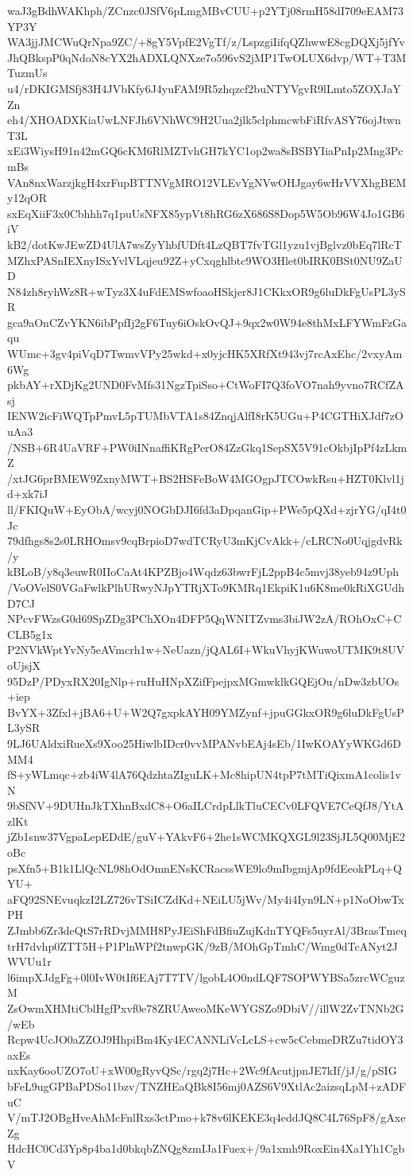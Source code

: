 waJ3gBdhWAKhph/ZCnzc0JSfV6pLmgMBvCUU+p2YTj08rmH58dI709eEAM73YP3Y
WA3jjJMCWuQrNpa9ZC/+8gY5VpfE2VgTf/z/LspzgiIifqQZhwwE8cgDQXj5jfYv
JhQBkspP0qNdoN8cYX2hADXLQNXze7o596vS2jMP1TwOLUX6dvp/WT+T3MTuzmUs
u4/rDKIGMSfj83H4JVbKfy6J4yuFAM9R5zhqzcf2buNTYVgvR9lLmto5ZOXJaYZn
eh4/XHOADXKiaUwLNFJh6VNhWC9H2Uua2jlk5clphmcwbFiRfvASY76ojJtwnT3L
xEi3WiysH91n42mGQ6cKM6RlMZTvhGH7kYC1op2wa8sBSBYIiaPnIp2Mng3PcmBs
VAn8nxWarzjkgH4xrFupBTTNVgMRO12VLEvYgNVwOHJgay6wHrVVXhgBEMy12qOR
sxEqXiiF3x0Cbhhh7q1puUsNFX85ypVt8hRG6zX686S8Dop5W5Ob96W4Jo1GB6iV
kB2/dotKwJEwZD4UlA7wsZyYhbfUDft4LzQBT7fvTGl1yzu1vjBglvz0bEq7lRcT
MZhxPASnIEXnyISxYvlVLqjeu92Z+yCxqghlbtc9WO3Hlet0bIRK0BSt0NU9ZaUD
N84zh8ryhWz8R+wTyz3X4uFdEMSwfoaoHSkjer8J1CKkxOR9g6luDkFgUsPL3ySR
gca9aOnCZvYKN6ibPpfIj2gF6Tuy6iOskOvQJ+9qx2w0W94e8thMxLFYWmFzGaqu
WUmc+3gv4piVqD7TwmvVPy25wkd+x0yjcHK5XRfXt943vj7rcAxEhc/2vxyAm6Wg
pkbAY+rXDjKg2UND0FvMfs31NgzTpiSso+CtWoFI7Q3foVO7nah9yvno7RCfZAsj
IENW2icFiWQTpPmvL5pTUMbVTA1s84ZnqjAlfI8rK5UGu+P4CGTHiXJdf7zOuAa3
/NSB+6R4UaVRF+PW0iINnaffiKRgPerO84ZzGkq1SepSX5V91cOkbjIpPf4zLkmZ
/xtJG6prBMEW9ZxnyMWT+BS2HSFeBoW4MGOgpJTCOwkRsu+HZT0Klvl1jd+xk7iJ
ll/FKIQuW+EyObA/wcyj0NOGbDJI6fd3aDpqanGip+PWe5pQXd+zjrYG/qI4t0Jc
79dfhgs8s2s0LRHOmsv9cqBrpioD7wdTCRyU3mKjCvAkk+/cLRCNo0UqjgdvRk/y
kBLoB/y8q3euwR0IIoCaAt4KPZBjo4Wqdz63bwrFjL2ppB4c5mvj38yeb94z9Uph
/VoOVelS0VGaFwlkPlhURwyNJpYTRjXTo9KMRq1EkpiK1u6K8me0kRiXGUdhD7CJ
NPcvFWzsG0d69SpZDg3PChXOn4DFP5QqWNITZvms3biJW2zA/ROhOxC+CCLB5g1x
P2NVkWptYvNy5eAVmcrh1w+NeUazn/jQAL6I+WkuVhyjKWuwoUTMK9t8UVoUjsjX
95DzP/PDyxRX20IgNlp+ruHuHNpXZifFpejpxMGmwklkGQEjOu/nDw3zbUOs+iep
BvYX+3Zfxl+jBA6+U+W2Q7gxpkAYH09YMZynf+jpuGGkxOR9g6luDkFgUsPL3ySR
9LJ6UAldxiRueXs9Xoo25HiwlbIDcr0vvMPANvbEAj4sEb/1IwKOAYyWKGd6DMM4
fS+yWLmqc+zb4iW4lA76QdzhtaZIguLK+Mc8hipUN4tpP7tMTiQixmA1colis1vN
9bSfNV+9DUHnJkTXhnBxdC8+O6aILCrdpLlkTluCECv0LFQVE7CeQfJ8/YtAzlKt
jZb1snw37VgpaLepEDdE/guV+YAkvF6+2he1sWCMKQXGL9l23SjJL5Q00MjE2oBc
psXfn5+B1k1LlQcNL98hOdOmnENsKCRacssWE9lo9mIbgmjAp9fdEeokPLq+QYU+
aFQ92SNEvuqkzI2LZ726vTSiICZdKd+NEiLU5jWv/My4i4Iyn9LN+p1NoObwTxPH
ZJmbb6Zr3deQtS7rRDvjMMH8PyJEiShFdBfiuZujKdnTYQFs5uyrAl/3BrasTmeq
trH7dvhp0ZTT5H+P1PlnWPf2tnwpGK/9zB/MOhGpTmhC/Wmg0dTcANyt2JWVUu1r
l6impXJdgFg+0l0IvW0tIf6EAj7T7TV/lgobL4O0ndLQF7SOPWYBSa5zrcWCguzM
ZsOwmXHMtiCblHgfPxvf0e78ZRUAweoMKeWYGSZo9DbiV//illW2ZvTNNb2G/wEb
Rcpw4UcJO0aZZOJ9HhpiBm4Ky4ECANNLiVcLcLS+cw5cCebmeDRZu7tidOY3axEs
nxKay6ooUZO7oU+xW00gRyvQSc/rgq2j7Hc+2Wc9fAcutjpnJE7kIf/jJ/g/pSIG
bFeL9ugGPBaPDSo11bzv/TNZHEaQBk8I56mj0AZS6V9XtlAc2aizsqLpM+zADFuC
V/mTJ2OBgHveAhMcFnlRxs3ctPmo+k78v6lKEKE3q4eddJQ8C4L76SpF8/gAxeZg
HdcHC0Cd3Yp8p4ba1d0bkqbZNQg8zmIJa1Fuex+/9a1xmh9RoxEin4Xa1Yh1CgbV
